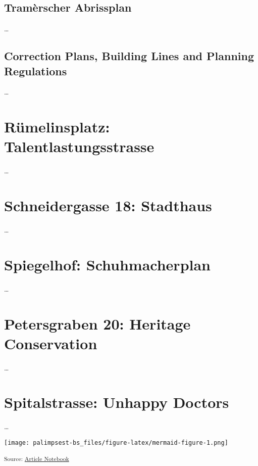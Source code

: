 \documentclass[
  letterpaper,
  DIV=11,
  numbers=noendperiod]{scrartcl}
\begin{document}
\subsection{Tramèrscher Abrissplan}\label{tramuxe8rscher-abrissplan}

\ldots{}

\subsection{Correction Plans, Building Lines and Planning
Regulations}\label{correction-plans-building-lines-and-planning-regulations}

\ldots{}

\section{Rümelinsplatz:
Talentlastungsstrasse}\label{ruxfcmelinsplatz-talentlastungsstrasse}

\ldots{}

\section{Schneidergasse 18:
Stadthaus}\label{schneidergasse-18-stadthaus}

\ldots{}

\section{Spiegelhof: Schuhmacherplan}\label{spiegelhof-schuhmacherplan}

\ldots{}

\section{Petersgraben 20: Heritage
Conservation}\label{petersgraben-20-heritage-conservation}

\ldots{}

\section{Spitalstrasse: Unhappy
Doctors}\label{spitalstrasse-unhappy-doctors}

\ldots{}

\texttt{[image: palimpsest-bs\_files/figure-latex/mermaid-figure-1.png]}

\textsubscript{Source:
\href{https://mtwente.github.io/palimpsest-bs/palimpsest-bs.qmd.html}{Article
Notebook}}
\end{document}
